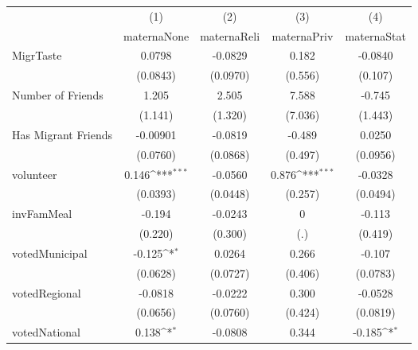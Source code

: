 {
\def\sym#1{\ifmmode^{#1}\else\(^{#1}\)\fi}
\begin{tabular}{l*{4}{c}}
\hline\hline
            &\multicolumn{1}{c}{(1)}&\multicolumn{1}{c}{(2)}&\multicolumn{1}{c}{(3)}&\multicolumn{1}{c}{(4)}\\
            &\multicolumn{1}{c}{maternaNone}&\multicolumn{1}{c}{maternaReli}&\multicolumn{1}{c}{maternaPriv}&\multicolumn{1}{c}{maternaStat}\\
\hline
MigrTaste   &      0.0798         &     -0.0829         &       0.182         &     -0.0840         \\
            &    (0.0843)         &    (0.0970)         &     (0.556)         &     (0.107)         \\
[1em]
Number of Friends&       1.205         &       2.505         &       7.588         &      -0.745         \\
            &     (1.141)         &     (1.320)         &     (7.036)         &     (1.443)         \\
[1em]
Has Migrant Friends&    -0.00901         &     -0.0819         &      -0.489         &      0.0250         \\
            &    (0.0760)         &    (0.0868)         &     (0.497)         &    (0.0956)         \\
[1em]
volunteer   &       0.146\sym{***}&     -0.0560         &       0.876\sym{***}&     -0.0328         \\
            &    (0.0393)         &    (0.0448)         &     (0.257)         &    (0.0494)         \\
[1em]
invFamMeal  &      -0.194         &     -0.0243         &           0         &      -0.113         \\
            &     (0.220)         &     (0.300)         &         (.)         &     (0.419)         \\
[1em]
votedMunicipal&      -0.125\sym{*}  &      0.0264         &       0.266         &      -0.107         \\
            &    (0.0628)         &    (0.0727)         &     (0.406)         &    (0.0783)         \\
[1em]
votedRegional&     -0.0818         &     -0.0222         &       0.300         &     -0.0528         \\
            &    (0.0656)         &    (0.0760)         &     (0.424)         &    (0.0819)         \\
[1em]
votedNational&       0.138\sym{*}  &     -0.0808         &       0.344         &      -0.185\sym{*}  \\

\end{tabular}}
